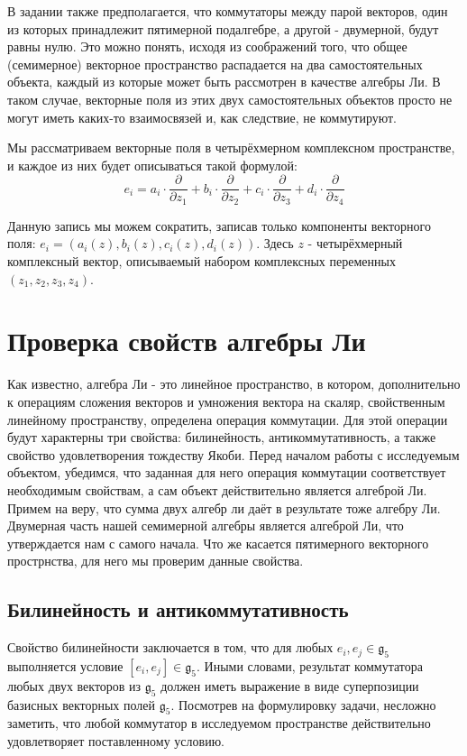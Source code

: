\documentclass{article}
\begin{document}
В задании также предполагается, что коммутаторы между парой векторов, один из которых принадлежит пятимерной подалгебре, а другой - двумерной, будут равны нулю. Это можно понять, исходя из соображений того, что общее (семимерное) векторное пространство распадается на два самостоятельных объекта, каждый из которые может быть рассмотрен в качестве алгебры Ли. В таком случае, векторные поля из этих двух самостоятельных объектов просто не могут иметь каких-то взаимосвязей и, как следствие, не коммутируют.

Мы рассматриваем векторные поля в четырёхмерном комплексном пространстве, и каждое из них будет описываться такой формулой:
\begin{equation}
e_{i} = a_{i} \cdot \frac{\partial}{\partial z_{1}} + b_{i} \cdot \frac{\partial}{\partial z_{2}} + c_{i} \cdot \frac{\partial}{\partial z_{3}} + d_{i} \cdot \frac{\partial}{\partial z_{4}}
\end{equation}

Данную запись мы можем сократить, записав только компоненты векторного поля: $e_{i} = (a_{i}(z), b_{i}(z), c_{i}(z), d_{i}(z))$. Здесь $z$ - четырёхмерный комплексный вектор, описываемый набором комплексных переменных  $(z_{1}, z_{2}, z_{3}, z_{4})$.

\newpage
\section{Проверка свойств алгебры Ли}
Как известно, алгебра Ли - это линейное пространство, в котором, дополнительно к операциям сложения векторов и умножения вектора на скаляр, свойственным линейному пространству, определена операция коммутации. Для этой операции будут характерны три свойства: билинейность, антикоммутативность, а также свойство удовлетворения тождеству Якоби. Перед началом работы с исследуемым объектом, убедимся, что заданная для него операция коммутации соответствует необходимым свойствам, а сам объект действительно является алгеброй Ли. Примем на веру, что сумма двух алгебр ли даёт в результате тоже алгебру Ли. Двумерная часть нашей семимерной алгебры является алгеброй Ли, что утверждается нам с самого начала. Что же касается пятимерного векторного прострнства, для него мы проверим данные свойства.

\subsection{Билинейность и антикоммутативность}
Свойство билинейности заключается в том, что для любых $e_{i}, e_{j} \in \mathfrak{g}_{5}$ выполняется условие $[e_{i}, e_{j}] \in \mathfrak{g}_{5}$. Иными словами, результат коммутатора любых двух векторов из $\mathfrak{g}_{5}$ должен иметь выражение в виде суперпозиции базисных векторных полей $\mathfrak{g}_{5}$. Посмотрев на формулировку задачи, несложно заметить, что любой коммутатор в исследуемом пространстве действительно удовлетворяет поставленному условию.
\end{document}
